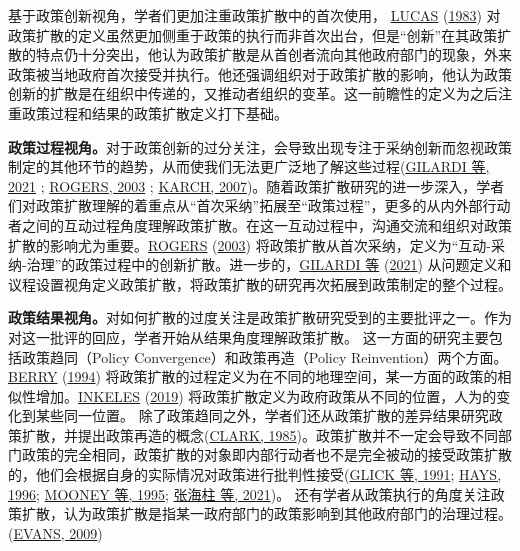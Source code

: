 \documentclass[
  12pt,
]{ctexart}
\begin{document}
基于政策创新视角，学者们更加注重政策扩散中的首次使用， \protect\hyperlink{ref-Lucas1983}{LUCAS} (\protect\hyperlink{ref-Lucas1983}{1983}) 对政策扩散的定义虽然更加侧重于政策的执行而非首次出台，但是``创新''在其政策扩散的特点仍十分突出，他认为政策扩散是从首创者流向其他政府部门的现象，外来政策被当地政府首次接受并执行。他还强调组织对于政策扩散的影响，他认为政策创新的扩散是在组织中传递的，又推动者组织的变革。这一前瞻性的定义为之后注重政策过程和结果的政策扩散定义打下基础。

\textbf{政策过程视角。}对于政策创新的过分关注，会导致出现专注于采纳创新而忽视政策制定的其他环节的趋势，从而使我们无法更广泛地了解这些过程(\protect\hyperlink{ref-GilardiEtAl2021}{GILARDI 等, 2021} ; \protect\hyperlink{ref-Rogers2003}{ROGERS, 2003} ; \protect\hyperlink{ref-Karch2007}{KARCH, 2007})。随着政策扩散研究的进一步深入，学者们对政策扩散理解的着重点从``首次采纳''拓展至``政策过程''，更多的从内外部行动者之间的互动过程角度理解政策扩散。在这一互动过程中，沟通交流和组织对政策扩散的影响尤为重要。\protect\hyperlink{ref-Rogers2003}{ROGERS} (\protect\hyperlink{ref-Rogers2003}{2003}) 将政策扩散从首次采纳，定义为``互动-采纳-治理''的政策过程中的创新扩散。进一步的，\protect\hyperlink{ref-GilardiEtAl2021}{GILARDI 等} (\protect\hyperlink{ref-GilardiEtAl2021}{2021}) 从问题定义和议程设置视角定义政策扩散，将政策扩散的研究再次拓展到政策制定的整个过程。

\textbf{政策结果视角。}对如何扩散的过度关注是政策扩散研究受到的主要批评之一。作为对这一批评的回应，学者开始从结果角度理解政策扩散。
这一方面的研究主要包括政策趋同（Policy Convergence）和政策再造（Policy Reinvention）两个方面。\protect\hyperlink{ref-Berry1994}{BERRY} (\protect\hyperlink{ref-Berry1994}{1994}) 将政策扩散的过程定义为在不同的地理空间，某一方面的政策的相似性增加。\protect\hyperlink{ref-Inkeles2019}{INKELES} (\protect\hyperlink{ref-Inkeles2019}{2019}) 将政策扩散定义为政府政策从不同的位置，人为的变化到某些同一位置。
除了政策趋同之外，学者们还从政策扩散的差异结果研究政策扩散，并提出政策再造的概念(\protect\hyperlink{ref-Clark1985}{CLARK, 1985})。政策扩散并不一定会导致不同部门政策的完全相同，政策扩散的对象即内部行动者也不是完全被动的接受政策扩散的，他们会根据自身的实际情况对政策进行批判性接受(\protect\hyperlink{ref-GlickHays1991}{GLICK 等, 1991}; \protect\hyperlink{ref-Hays1996}{HAYS, 1996}; \protect\hyperlink{ref-MooneyLee1995}{MOONEY 等, 1995}; \protect\hyperlink{ref-ZhangHaiZhuLinHuaJing2021}{张海柱 等, 2021})。
还有学者从政策执行的角度关注政策扩散，认为政策扩散是指某一政府部门的政策影响到其他政府部门的治理过程。(\protect\hyperlink{ref-Evans2009}{EVANS, 2009})
\end{document}
